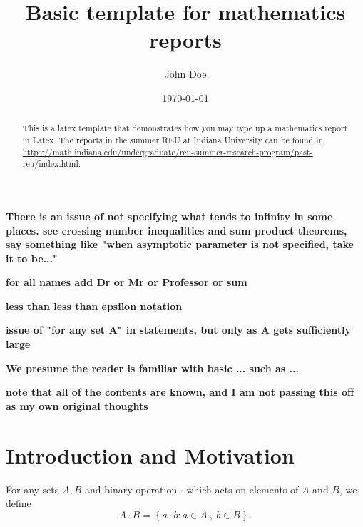 \documentclass[12pt]{amsart}
\begin{document}
\title{Basic template for mathematics reports} 

\author[Doe]{John Doe}
\address{Department of Mathematics\\
         Research Institution,
         City, State XXXXX
         Country} 
\date{\today}

\begin{abstract}
This is a latex template that demonstrates how you may type up a mathematics report in Latex. The reports in the summer REU at Indiana University can be found in \url{https://math.indiana.edu/undergraduate/reu-summer-research-program/past-reu/index.html}.

\end{abstract}

\maketitle


\textbf{There is an issue of not specifying what tends to infinity in some places. see crossing number inequalities and sum product theorems, say something like "when asymptotic parameter is not specified, take it to be..."}

\textbf{for all names add Dr or Mr or Professor or sum}

\textbf{less than less than epsilon notation}

\textbf{issue of "for any set A" in statements, but only as A gets sufficiently large}

\textbf{We presume the reader is familiar with basic ... such as ... }

\textbf{note that all of the contents are known, and I am not passing this off as my own original thoughts}

\section{Introduction and Motivation} 

For any sets \(A,B\) and binary operation \(\cdot \) which acts on elements of \(A\) and \(B\), we define
\[
    A \cdot  B = \left\{ a \cdot  b : a \in A~,~ b \in B \right\} 
.\]
\end{document}

